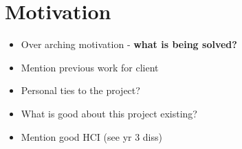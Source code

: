 \section{Motivation}
{\color{red}
	\begin{itemize}
		\item Over arching motivation - \textbf{what is being solved?}
		\item Mention previous work for client
		\item Personal ties to the project?
		\item What is good about this project existing?
		\item Mention good HCI (see yr 3 diss)				
	\end{itemize}
}